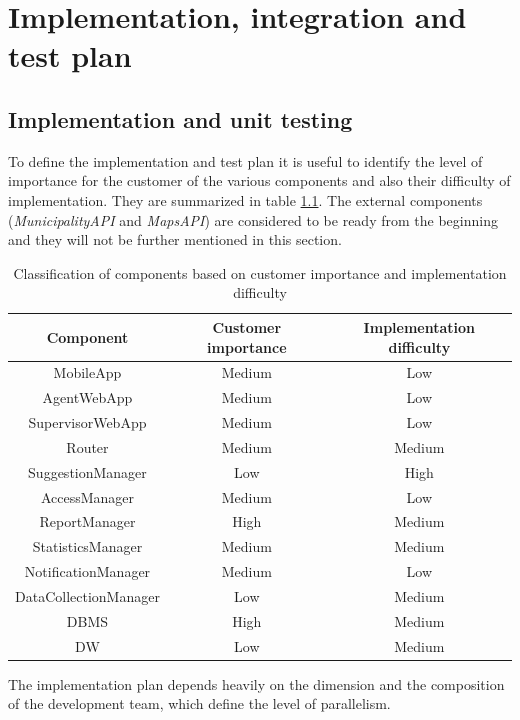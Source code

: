 \documentclass[a4paper]{report}
\begin{document}
\chapter{Implementation, integration and test plan}
\section{Implementation and unit testing}
To define the implementation and test plan it is useful to identify the level of importance for the customer of the various components and also their difficulty of implementation. They are summarized in table \ref{tab-testing}. The external components (\textit{MunicipalityAPI} and \textit{MapsAPI}) are considered to be ready from the beginning and they will not be further mentioned in this section.\\
\begin{table}[H]  
  \centering
  \bgroup
  \def\arraystretch{1.5}%
  \begin{tabular}{|c|c|c|}
    \cline{1-3}
    \textbf{Component} & \textbf{Customer importance} & \textbf{Implementation difficulty} \\ \hline
    MobileApp & Medium & Low   \\ \hline
    AgentWebApp & Medium & Low   \\ \hline
    SupervisorWebApp & Medium & Low   \\ \hline
    Router & Medium & Medium   \\ \hline
    SuggestionManager & Low & High   \\ \hline
    AccessManager & Medium & Low   \\ \hline
    ReportManager & High & Medium   \\ \hline
    StatisticsManager & Medium & Medium   \\ \hline
    NotificationManager & Medium & Low   \\ \hline
    DataCollectionManager & Low & Medium   \\ \hline
    DBMS & High & Medium   \\ \hline
    DW & Low & Medium   \\ \hline
    
  \end{tabular}
  \egroup
  \caption{Classification of components based on customer importance and implementation difficulty}
  \label{tab-testing}
\end{table}
The implementation plan depends heavily on the dimension and the composition of the development team, which define the level of parallelism.
\end{document}
